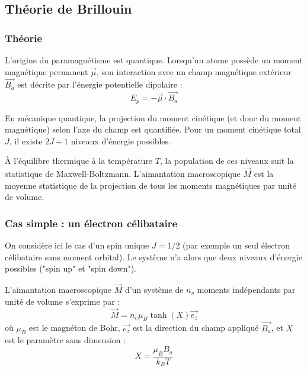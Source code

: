 \documentclass[french]{yLectureNote}
\renewcommand{\vec}{\overrightarrow}
\begin{document}

\subsection{Théorie de Brillouin}

\subsubsection{Théorie}

L'origine du paramagnétisme est quantique. Lorsqu'un atome possède un moment magnétique permanent $\vec{\mu}$, son interaction avec un champ magnétique extérieur $\vec{B_a}$ est décrite par l'énergie potentielle dipolaire :
$$E_p = -\vec{\mu} \cdot \vec{B_a}$$

En mécanique quantique, la projection du moment cinétique (et donc du moment magnétique) selon l'axe du champ est quantifiée. Pour un moment cinétique total $J$, il existe $2J+1$ niveaux d'énergie possibles. 

À l'équilibre thermique à la température $T$, la population de ces niveaux suit la statistique de Maxwell-Boltzmann. L'aimantation macroscopique $\vec{M}$ est la moyenne statistique de la projection de tous les moments magnétiques par unité de volume. 

\subsubsection{Cas simple : un électron célibataire}

On considère ici le cas d'un spin unique $J = 1/2$ (par exemple un seul électron célibataire sans moment orbital). Le système n'a alors que deux niveaux d'énergie possibles ("spin up" et "spin down").

\begin{proposition}
L'aimantation macroscopique $\vec{M}$ d'un système de $n_v$ moments indépendants par unité de volume s'exprime par :
$$\vec{M} = n_v \mu_B \tanh(X)\vec{e_z}$$
où $\mu_B$ est le magnéton de Bohr, $\vec{e_z}$ est la direction du champ appliqué $\vec{B_a}$, et $X$ est le paramètre sans dimension :
$$X = \frac{\mu_B B_a}{k_B T}$$
\end{proposition}

\end{document}
